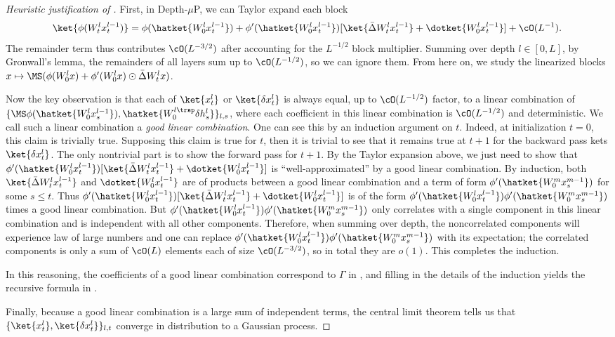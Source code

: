 \begin{proof}[Heuristic justification of ]
First, in Depth-$\mu$P, we can Taylor expand each block
$$\ket{\phi(W^l_t x^{l-1}_t)} = \phi(\hatket{W^l_0 x^{l-1}_t}) + \phi'(\hatket{W^l_0 x^{l-1}_t}) [\ket{\bar\Delta W^l_t x^{l-1}_t} + \dotket{W^l_0 x^{l-1}_t}] + \cO(L^{-1}).$$
The remainder term thus contributes $\cO(L^{-3/2})$ after accounting for the $L^{-1/2}$ block multiplier. Summing over depth $l \in [0, L]$, by Gronwall's lemma, the remainders of all layers sum up to $\cO(L^{-1/2})$, so we can ignore them.
From here on, we study the linearized blocks $x \mapsto \MS(\phi(W^l_0 x) + \phi'(W^l_0 x) \odot \bar\Delta W^l_t x)$.

Now the key observation is that each of $\ket{x^l_t}$ or $\ket{\delta x^l_t}$ is always equal, up to $\cO(L^{-1/2})$ factor, to a linear combination of $\{\MS \phi(\hatket{W^l_0 x^{l-1}_s}), \hatket{W^{l \trsp}_0 \delta h^l_s}\}_{l, s}$, where each coefficient in this linear combination is $\cO(L^{-1/2})$ and deterministic.
We call such a linear combination a \emph{good linear combination}.
One can see this by an induction argument on $t$.
Indeed, at initialization $t=0$, this claim is trivially true.
Supposing this claim is true for $t$, then it is trivial to see that it remains true at $t+1$ for the backward pass kets $\ket{\delta x^l_t}$.
The only nontrivial part is to show the forward pass for $t+1$.
By the Taylor expansion above, we just need to show that $\phi'(\hatket{W^l_0 x^{l-1}_t}) [\ket{\bar\Delta W^l_t x^{l-1}_t} + \dotket{W^l_0 x^{l-1}_t}]$ is ``well-approximated'' by a good linear combination.
By induction, both $\ket{\bar\Delta W^l_t x^{l-1}_t}$ and $\dotket{W^l_0 x^{l-1}_t}$ are of products between a good linear combination and a term of form $ \phi'(\hatket{W^m_0 x^{m-1}_s})$ for some $s \le t$. Thus $\phi'(\hatket{W^l_0 x^{l-1}_t}) [\ket{\bar\Delta W^l_t x^{l-1}_t} + \dotket{W^l_0 x^{l-1}_t}]$ is of the form $\phi'(\hatket{W^l_0 x^{l-1}_t})\phi'(\hatket{W^m_0 x^{m-1}_s})$ times a good linear combination.
But $\phi'(\hatket{W^l_0 x^{l-1}_t})\phi'(\hatket{W^m_0 x^{m-1}_s})$ only correlates with a single component in this linear combination and is independent with all other components.
Therefore, when summing over depth, the noncorrelated components will experience law of large numbers and one can replace $\phi'(\hatket{W^l_0 x^{l-1}_t})\phi'(\hatket{W^m_0 x^{m-1}_s})$ with its expectation; the correlated components is only a sum of $\cO(L)$ elements each of size $\cO(L^{-3/2})$, so in total they are $o(1)$.
This completes the induction.

In this reasoning, the coefficients of a good linear combination correspond to $\Gamma$ in , and filling in the details of the induction yields the recursive formula in .

Finally, because a good linear combination is a large sum of independent terms, the central limit theorem tells us that $\{\ket{x^l_t}, \ket{\delta x^l_t}\}_{l, t}$ converge in distribution to a Gaussian process.
\end{proof}

